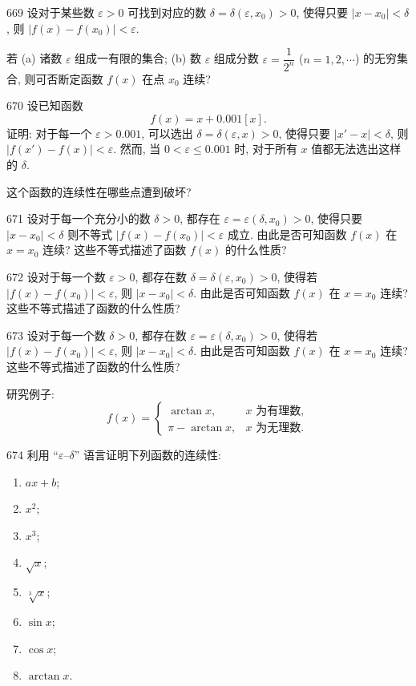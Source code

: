 \begin{prob}[M]{669}
设对于某些数 $\varepsilon > 0$ 可找到对应的数 $\delta = \delta(\varepsilon, x_0) > 0$, 使得只要 $|x - x_0| < \delta$, 则 $|f(x) - f(x_0)| < \varepsilon$.

若 (a) 诸数 $\varepsilon$ 组成一有限的集合; (b) 数 $\varepsilon$ 组成分数 $\varepsilon = \dfrac{1}{2^n}$ ($n = 1, 2, \cdots$) 的无穷集合, 则可否断定函数 $f(x)$ 在点 $x_0$ 连续?
\end{prob}

\begin{prob}[M]{670}
设已知函数
\[
  f(x) = x + 0.001[x].
\]
证明: 对于每一个 $\varepsilon > 0.001$, 可以选出 $\delta = \delta(\varepsilon, x) > 0$, 使得只要 $|x' - x| < \delta$, 则 $|f(x') - f(x)| < \varepsilon$. 然而, 当 $0 < \varepsilon \leqslant 0.001$ 时, 对于所有 $x$ 值都无法选出这样的 $\delta$.

这个函数的连续性在哪些点遭到破坏?
\end{prob}

\begin{prob}[M]{671}
设对于每一个充分小的数 $\delta > 0$, 都存在 $\varepsilon = \varepsilon(\delta, x_0) > 0$, 使得只要 $|x - x_0| < \delta$ 则不等式 $|f(x) - f(x_0)| < \varepsilon$ 成立. 由此是否可知函数 $f(x)$ 在 $x = x_0$ 连续? 这些不等式描述了函数 $f(x)$ 的什么性质?
\end{prob}

\begin{prob}[M]{672}
设对于每一个数 $\varepsilon > 0$, 都存在数 $\delta = \delta(\varepsilon, x_0) > 0$, 使得若 $|f(x) - f(x_0)| < \varepsilon$, 则 $|x - x_0| < \delta$. 由此是否可知函数 $f(x)$ 在 $x = x_0$ 连续? 这些不等式描述了函数的什么性质?
\end{prob}

\begin{prob}[M]{673}
设对于每一个数 $\delta > 0$, 都存在数 $\varepsilon = \varepsilon(\delta, x_0) > 0$, 使得若 $|f(x) - f(x_0)| < \varepsilon$, 则 $|x - x_0| < \delta$. 由此是否可知函数 $f(x)$ 在 $x = x_0$ 连续? 这些不等式描述了函数的什么性质?

研究例子:
\[
  f(x) = \begin{cases}
    \arctan x, & x\text{ 为有理数}, \\
    \pi - \arctan x, & x\text{ 为无理数}.
  \end{cases}
\]
\end{prob}

\begin{prob}[L]{674}
利用 “$\varepsilon$--$\delta$” 语言证明下列函数的连续性:
\begin{enumerate}[label=(\alph*), itemsep=2pt, topsep=3pt]
  \item $ax + b$;
  \item $x^2$;
  \item $x^3$;
  \item $\sqrt{x}$;
  \item $\sqrt[3]{x}$;
  \item $\sin x$;
  \item $\cos x$;
  \item $\arctan x$.
\end{enumerate}
\end{prob}

